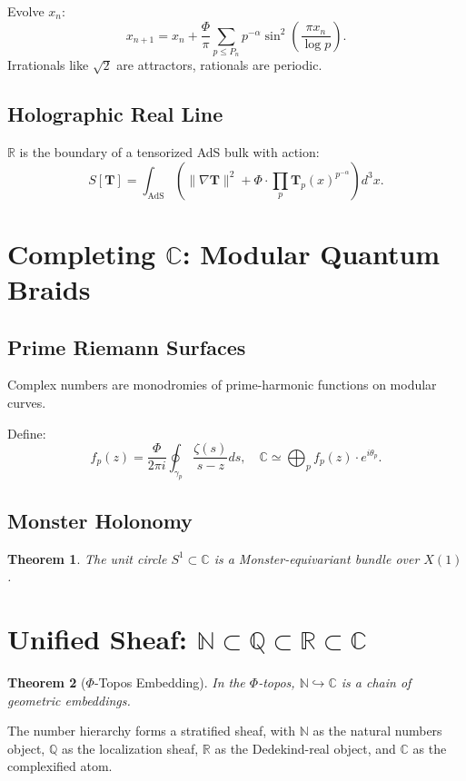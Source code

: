 \documentclass{article}
\theoremstyle{plain}
\newtheorem{theorem}{Theorem}
\begin{document}
Evolve $x_n$:
\[
x_{n+1} = x_n + \frac{\Phi}{\pi} \sum_{p \leq P_n} p^{-\alpha} \sin^2\left( \frac{\pi x_n}{\log p} \right).
\]
Irrationals like $\sqrt{2}$ are attractors, rationals are periodic.

\subsection{Holographic Real Line}
\begin{conjecture}
$\mathbb{R}$ is the boundary of a tensorized AdS bulk with action:
\[
S[\mathbf{T}] = \int_{\text{AdS}} \left( \|\nabla \mathbf{T}\|^2 + \Phi \cdot \prod_p \mathbf{T}_p(x)^{p^{-\alpha}} \right) d^3x.
\]
\end{conjecture}

\section{Completing $\mathbb{C}$: Modular Quantum Braids}
\subsection{Prime Riemann Surfaces}
\begin{axiom}
Complex numbers are monodromies of prime-harmonic functions on modular curves.
\end{axiom}

Define:
\[
f_p(z) = \frac{\Phi}{2\pi i} \oint_{\gamma_p} \frac{\zeta(s)}{s - z} ds, \quad \mathbb{C} \simeq \bigoplus_p f_p(z) \cdot e^{i \theta_p}.
\]

\subsection{Monster Holonomy}
\begin{theorem}
The unit circle $S^1 \subset \mathbb{C}$ is a Monster-equivariant bundle over $X(1)$.
\end{theorem}

\section{Unified Sheaf: $\mathbb{N} \subset \mathbb{Q} \subset \mathbb{R} \subset \mathbb{C}$}
\begin{theorem}[$\Phi$-Topos Embedding]
In the $\Phi$-topos, $\mathbb{N} \hookrightarrow \mathbb{C}$ is a chain of geometric embeddings.
\end{theorem}
The number hierarchy forms a stratified sheaf, with $\mathbb{N}$ as the natural numbers object, $\mathbb{Q}$ as the localization sheaf, $\mathbb{R}$ as the Dedekind-real object, and $\mathbb{C}$ as the complexified atom.
\end{document}
